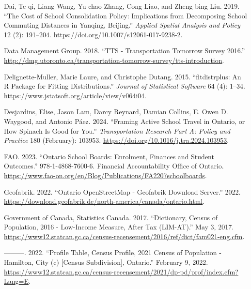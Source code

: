 \documentclass[
default
]{sn-jnl}
\newlength{\cslhangindent}
\newenvironment{CSLReferences}[2] %
 {\begin{list}{}{%
  \setlength{\itemindent}{0pt}
  \setlength{\leftmargin}{0pt}
  \setlength{\parsep}{0pt}
  \ifodd #1
   \setlength{\leftmargin}{\cslhangindent}
   \setlength{\itemindent}{-1\cslhangindent}
  \fi
  \setlength{\itemsep}{#2\baselineskip}}}
 {\end{list}}
\begin{document}
\begin{CSLReferences}{1}{0}
Dai, Te-qi, Liang Wang, Yu-chao Zhang, Cong Liao, and Zheng-bing Liu.
2019. {``The Cost of School Consolidation Policy: Implications from
Decomposing School Commuting Distances in Yanqing, Beijing.''}
\emph{Applied Spatial Analysis and Policy} 12 (2): 191--204.
\url{https://doi.org/10.1007/s12061-017-9238-2}.

Data Management Group. 2018. {``{TTS} - {Transportation} {Tomorrow}
{Survey} 2016.''}
\url{http://dmg.utoronto.ca/transportation-tomorrow-survey/tts-introduction}.

Delignette-Muller, Marie Laure, and Christophe Dutang. 2015.
{``{fitdistrplus}: An {R} Package for Fitting Distributions.''}
\emph{Journal of Statistical Software} 64 (4): 1--34.
\url{https://www.jstatsoft.org/article/view/v064i04}.

Desjardins, Elise, Jason Lam, Darcy Reynard, Damian Collins, E. Owen D.
Waygood, and Antonio Páez. 2024. {``Framing Active School Travel in
{Ontario}, or How Spinach Is Good for You.''} \emph{Transportation
Research Part A: Policy and Practice} 180 (February): 103953.
\url{https://doi.org/10.1016/j.tra.2024.103953}.

FAO. 2023. {``Ontario School Boards: Enrolment, Finances and Student
Outcomes.''} 978-1-4868-7600-6. Financial Accountability Office of
Ontario.
\url{https://www.fao-on.org/en/Blog/Publications/FA2207schoolboards}.

Geofabrik. 2022. {``Ontario {OpenStreetMap} - {Geofabrik Download
Server}.''} 2022.
\url{https://download.geofabrik.de/north-america/canada/ontario.html}.

Government of Canada, Statistics Canada. 2017. {``Dictionary, Census of
Population, 2016 - Low-Income Measure, After Tax ({LIM}-{AT}).''} May 3,
2017.
\url{https://www12.statcan.gc.ca/census-recensement/2016/ref/dict/fam021-eng.cfm}.

---------. 2022. {``Profile Table, Census Profile, 2021 Census of
Population - Hamilton, City (c) {[}Census Subdivision{]}, Ontario.''}
February 9, 2022.
\url{https://www12.statcan.gc.ca/census-recensement/2021/dp-pd/prof/index.cfm?Lang=E}.


\end{CSLReferences}
\end{document}
